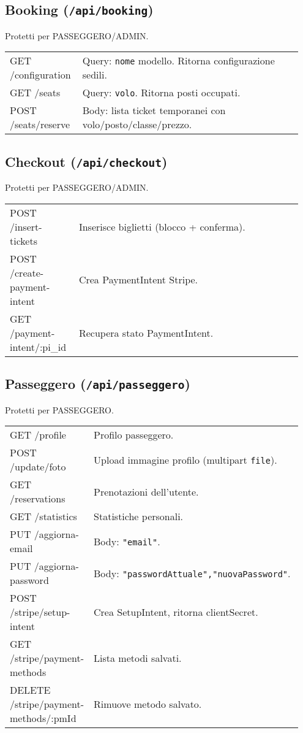 \documentclass[11pt,a4paper]{article}
\begin{document}
\subsection{Booking (\texttt{/api/booking})}
Protetti per PASSEGGERO/ADMIN.
\begin{longtable}{p{0.22\linewidth}p{0.73\linewidth}}
GET /configuration & Query: \texttt{nome} modello. Ritorna configurazione sedili. \\
GET /seats & Query: \texttt{volo}. Ritorna posti occupati. \\
POST /seats/reserve & Body: lista ticket temporanei con volo/posto/classe/prezzo. \\
\end{longtable}

\subsection{Checkout (\texttt{/api/checkout})}
Protetti per PASSEGGERO/ADMIN.
\begin{longtable}{p{0.22\linewidth}p{0.73\linewidth}}
POST /insert-tickets & Inserisce biglietti (blocco + conferma). \\
POST /create-payment-intent & Crea PaymentIntent Stripe. \\
GET /payment-intent/:pi\_id & Recupera stato PaymentIntent. \\
\end{longtable}

\subsection{Passeggero (\texttt{/api/passeggero})}
Protetti per PASSEGGERO.
\begin{longtable}{p{0.22\linewidth}p{0.73\linewidth}}
GET /profile & Profilo passeggero. \\
POST /update/foto & Upload immagine profilo (multipart \texttt{file}). \\
GET /reservations & Prenotazioni dell'utente. \\
GET /statistics & Statistiche personali. \\
PUT /aggiorna-email & Body: \texttt{"email"}. \\
PUT /aggiorna-password & Body: \texttt{"passwordAttuale","nuovaPassword"}. \\
POST /stripe/setup-intent & Crea SetupIntent, ritorna clientSecret. \\
GET /stripe/payment-methods & Lista metodi salvati. \\
DELETE /stripe/payment-methods/:pmId & Rimuove metodo salvato. \\
\end{longtable}
\end{document}
